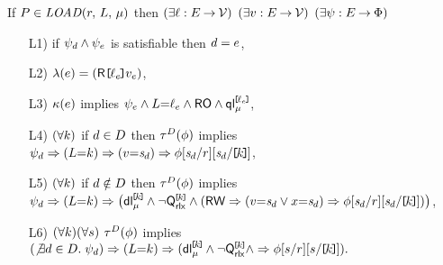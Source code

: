 \noindent
If $\aPS \in \sLOAD[\amode]{\aReg}{\cExp}$ then
$(\exists\cVal:\aEvs\fun\Val)$
$(\exists\aVal:\aEvs\fun\Val)$
$(\exists\bForm:\aEvs\fun\Formulae)$
\begin{enumerate}
\item[L1)] if $\bForm_\bEv\land\bForm_\aEv$ is satisfiable then $\bEv=\aEv$,
\item[L2)] $\labelingAct(\aEv) = \DRREFP{\cVal_\aEv}{\aVal_\aEv}$,
\item[L3)] $\labelingForm(\aEv)$ implies
  \begin{math}
    \bForm_\aEv
    \land \cExp{=}\cVal_\aEv
    \land \RO
    \land \QL{\REF{\cVal_\aEv}}{\amode}
  \end{math},
\item[L4)]
  \begin{math}
    (\forall\dVal)
  \end{math}
  if $\bEv\in\bEvs$ then
  $\aTr[\bEvs](\aForm)$ implies
  \begin{math}
    \bForm_\bEv
    \limplies (\cExp{=}\dVal)
    \limplies (\aVal{=}\uReg{\bEv})
    \limplies \aForm[\uReg{\bEv}/\aReg][\uReg{\bEv}/\REF{\dVal}]
  \end{math},
  \makebox[4.8cm]{}
\item[L5)] 
  \begin{math}
    (\forall\dVal)
  \end{math}
  if $\bEv\notin\bEvs$ then
  $\aTr[\bEvs](\aForm)$ implies
  \begin{math}
    \bForm_\bEv
    \limplies (\cExp{=}\dVal)
    \limplies \PBRbig{        
      \DL{\REF{\dVal}}{\amode}
      \land \lnot\QxREF{\dVal}
      \land
      (\RW
      \limplies (\aVal{=}\uReg{\bEv}\lor\aLoc{=}\uReg{\bEv}) 
      \limplies \aForm[\uReg{\bEv}/\aReg][\uReg{\bEv}/\REF{\dVal}]
      )
    }      
  \end{math},
\item[L6)] %
  \begin{math}
    (\forall\dVal)
    (\forall\bReg)
  \end{math}
  $\aTr[\bEvs](\aForm)$ implies 
  \begin{math}
    (\not\exists\bEv\in\bEvs.\; \bForm_\bEv)
    \limplies (\cExp{=}\dVal)
    \limplies \PBR{        
      \DL{\REF{\dVal}}{\amode}
      \land \lnot\QxREF{\dVal}
      \land
      \limplies \aForm[\bReg/\aReg][\bReg/\REF{\dVal}]
    }.
  \end{math}
\end{enumerate}  
